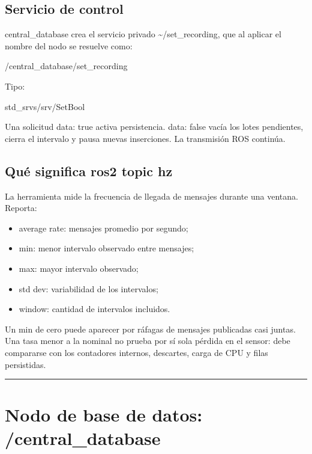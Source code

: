 \documentclass[11pt,a4paper]{article}
\begin{document}
\subsection{Servicio de control}

{\ttfamily\small central\_database} crea el servicio privado {\ttfamily\small \textasciitilde{}/set\_recording}, que al aplicar el nombre del nodo se resuelve como:

\begin{MuseCode}
/central_database/set_recording
\end{MuseCode}

Tipo:

\begin{MuseCode}
std_srvs/srv/SetBool
\end{MuseCode}

Una solicitud {\ttfamily\small data: true} activa persistencia. {\ttfamily\small data: false} vacía los lotes pendientes, cierra el intervalo y pausa nuevas inserciones. La transmisión ROS continúa.

\subsection{Qué significa {\ttfamily\small ros2 topic hz}}

La herramienta mide la frecuencia de llegada de mensajes durante una ventana. Reporta:

\begin{itemize}
\item {\ttfamily\small average rate}: mensajes promedio por segundo;
\item {\ttfamily\small min}: menor intervalo observado entre mensajes;
\item {\ttfamily\small max}: mayor intervalo observado;
\item {\ttfamily\small std dev}: variabilidad de los intervalos;
\item {\ttfamily\small window}: cantidad de intervalos incluidos.
\end{itemize}

Un {\ttfamily\small min} de cero puede aparecer por ráfagas de mensajes publicadas casi juntas. Una tasa menor a la nominal no prueba por sí sola pérdida en el sensor: debe compararse con los contadores internos, descartes, carga de CPU y filas persistidas.

\medskip\hrule\medskip

\section{Nodo de base de datos: {\ttfamily\small /central\_database}}
\end{document}
